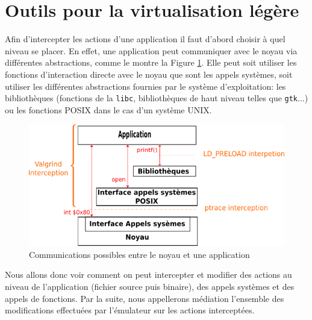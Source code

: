 \section{Outils pour la virtualisation légère}
\label{section:tools}

Afin d'intercepter les actions d'une application il faut d'abord choisir à quel
niveau se placer.  En effet, une application peut communiquer avec le noyau via
différentes abstractions, comme le montre la Figure \ref{AS_Communication}. Elle
peut soit utiliser les fonctions d'interaction directe avec le noyau que sont
les appels systèmes, soit utiliser les différentes abstractions fournies par le
système d'exploitation: les bibliothèques (fonctions de la \texttt{libc},
bibliothèques de haut niveau telles que \texttt{gtk}...) ou les
fonctions POSIX dans le cas d'un système UNIX.

\begin{figure}[H]
 \centering
 \includegraphics[scale=0.75]{Pictures/png/Communication_application_noyau_v3.png}
 \caption{Communications possibles entre le noyau et une application}
 \label{AS_Communication}
\end{figure}

Nous allons donc voir comment on peut intercepter et modifier des actions au
niveau de l'application (fichier source puis binaire), des appels systèmes et
des appels de fonctions. Par la suite, nous appellerons médiation l'ensemble des
modifications effectuées par l'émulateur sur les actions interceptées.

